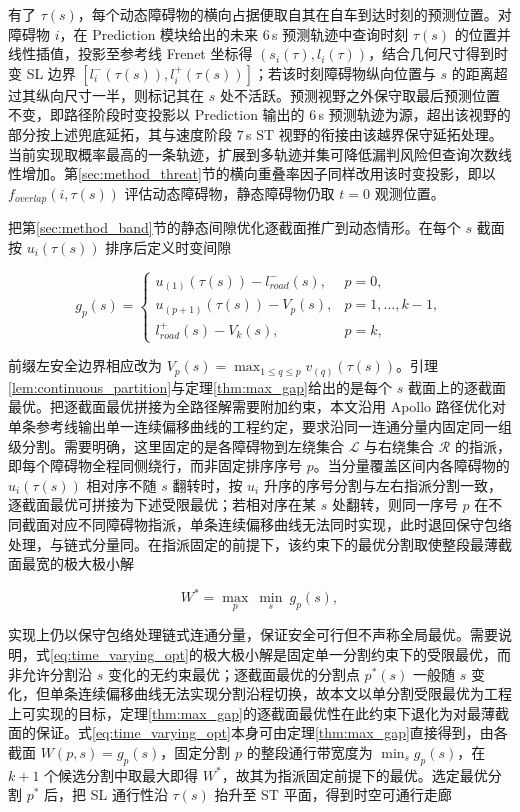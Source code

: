 \documentclass[a4paper,11pt]{ctexart}
\theoremstyle{definition}
\begin{document}
有了 $\tau(s)$，每个动态障碍物的横向占据便取自其在自车到达时刻的预测位置。对障碍物 $i$，在 Prediction 模块给出的未来 $6$\,s 预测轨迹中查询时刻 $\tau(s)$ 的位置并线性插值，投影至参考线 Frenet 坐标得 $(s_i(\tau), l_i(\tau))$，结合几何尺寸得到时变 SL 边界 $[l_i^{-}(\tau(s)), l_i^{+}(\tau(s))]$；若该时刻障碍物纵向位置与 $s$ 的距离超过其纵向尺寸一半，则标记其在 $s$ 处不活跃。预测视野之外保守取最后预测位置不变，即路径阶段时变投影以 Prediction 输出的 $6$\,s 预测轨迹为源，超出该视野的部分按上述兜底延拓，其与速度阶段 $7$\,s ST 视野的衔接由该越界保守延拓处理。当前实现取概率最高的一条轨迹，扩展到多轨迹并集可降低漏判风险但查询次数线性增加。第\ref{sec:method_threat}节的横向重叠率因子同样改用该时变投影，即以 $f_{overlap}(i, \tau(s))$ 评估动态障碍物，静态障碍物仍取 $t=0$ 观测位置。

把第\ref{sec:method_band}节的静态间隙优化逐截面推广到动态情形。在每个 $s$ 截面按 $u_i(\tau(s))$ 排序后定义时变间隙

\begin{equation}
    g_p(s) =
    \begin{cases}
        u_{(1)}(\tau(s)) - l_{road}^{-}(s), & p=0, \\[0.3em]
        u_{(p+1)}(\tau(s)) - V_p(s), & p=1,\ldots,k-1, \\[0.3em]
        l_{road}^{+}(s) - V_k(s), & p=k,
    \end{cases}
    \label{eq:time_varying_gap}
\end{equation}

前缀左安全边界相应改为 $V_p(s)=\max_{1\leq q\leq p} v_{(q)}(\tau(s))$。引理\ref{lem:continuous_partition}与定理\ref{thm:max_gap}给出的是每个 $s$ 截面上的逐截面最优。把逐截面最优拼接为全路径解需要附加约束，本文沿用 Apollo 路径优化对单条参考线输出单一连续偏移曲线的工程约定，要求沿同一连通分量内固定同一组级分割。需要明确，这里固定的是各障碍物到左绕集合 $\mathcal{L}$ 与右绕集合 $\mathcal{R}$ 的指派，即每个障碍物全程同侧绕行，而非固定排序序号 $p$。当分量覆盖区间内各障碍物的 $u_i(\tau(s))$ 相对序不随 $s$ 翻转时，按 $u_i$ 升序的序号分割与左右指派分割一致，逐截面最优可拼接为下述受限最优；若相对序在某 $s$ 处翻转，则同一序号 $p$ 在不同截面对应不同障碍物指派，单条连续偏移曲线无法同时实现，此时退回保守包络处理，与链式分量同。在指派固定的前提下，该约束下的最优分割取使整段最薄截面最宽的极大极小解

\begin{equation}
    W^{*} = \max_{p}\ \min_{s}\ g_p(s),
    \label{eq:time_varying_opt}
\end{equation}

实现上仍以保守包络处理链式连通分量，保证安全可行但不声称全局最优。需要说明，式\eqref{eq:time_varying_opt}的极大极小解是固定单一分割约束下的受限最优，而非允许分割沿 $s$ 变化的无约束最优；逐截面最优的分割点 $p^{*}(s)$ 一般随 $s$ 变化，但单条连续偏移曲线无法实现分割沿程切换，故本文以单分割受限最优为工程上可实现的目标，定理\ref{thm:max_gap}的逐截面最优性在此约束下退化为对最薄截面的保证。式\eqref{eq:time_varying_opt}本身可由定理\ref{thm:max_gap}直接得到，由各截面 $W(p,s)=g_p(s)$，固定分割 $p$ 的整段通行带宽度为 $\min_s g_p(s)$，在 $k+1$ 个候选分割中取最大即得 $W^{*}$，故其为指派固定前提下的最优。选定最优分割 $p^{*}$ 后，把 SL 通行性沿 $\tau(s)$ 抬升至 ST 平面，得到时空可通行走廊
\end{document}
